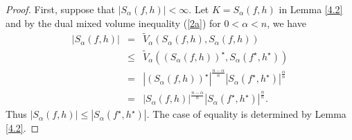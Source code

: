 \documentclass[preprint,12pt]{elsarticle}
\begin{document}
\begin{proof}
	First, suppose that $| {S}_{\alpha }(f,h)| < \infty $. Let $K = {S}_{\alpha }(f,h)$ in Lemma \ref{4.2} and by the dual mixed volume inequality (\ref{2a}) for $0 < \alpha < n$, we have
	\begin{eqnarray*}
		| {S}_{\alpha }(f,h)|&=&\widetilde{V}_{\alpha}\left ({S}_{\alpha }(f,h),{S}_{\alpha }(f,h)\right)\nonumber\\
		&\leq& \widetilde{V}_{\alpha}({({S}_{\alpha }(f,h))}^{\star },{S}_{\alpha }(f^{\star },h^{\star }))\nonumber\\
		&=& |({S}_{\alpha }(f,h))^{\star }|^{\frac{n-\alpha }{n}}|{S}_{\alpha }(f^{\star },h^{\star })|^{\frac{\alpha }{n}}\nonumber\\
		&=&|{S}_{\alpha }(f,h)|^{\frac{n-\alpha }{n}}|{S}_{\alpha }(f^{\star },h^{\star })|^{\frac{\alpha }{n}}.
	\end{eqnarray*} 
	Thus $\left | S_{\alpha }\left ( f,h \right )   \right |\le  \left | S_{\alpha }\left ( f^{\star } ,h^{\star }  \right )   \right |$. The case of equality is determined by Lemma \ref{4.2}.
	

\end{proof}
\end{document}
